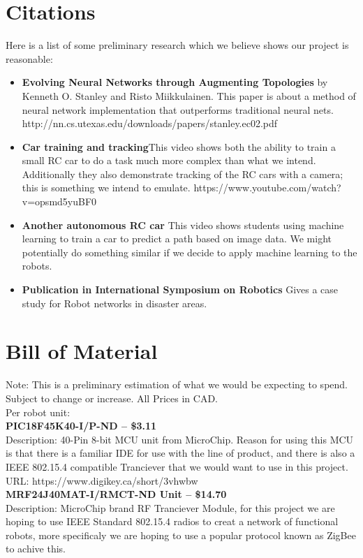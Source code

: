 \documentclass[a4paper]{article}
\begin{document}
	\section*{Citations}
	Here is a list of some preliminary research which we believe shows our project is reasonable:
	\begin{itemize}
		\item \textbf{Evolving Neural Networks through Augmenting Topologies} by Kenneth O. Stanley and Risto Miikkulainen. This paper is about a method of neural network implementation that outperforms traditional neural nets. http://nn.cs.utexas.edu/downloads/papers/stanley.ec02.pdf
		\item \textbf{Car training and tracking}This video shows both the ability to train a small RC car to do a task much more complex than what we intend. Additionally they also demonstrate tracking of the RC cars with a camera; this is something we intend to emulate. https://www.youtube.com/watch?v=opsmd5yuBF0
		\item \textbf{Another autonomous RC car} This video shows students using machine learning to train a car to predict a path based on image data. We might potentially do something similar if we decide to apply machine learning to the robots.
		\item \textbf{Publication in International Symposium on Robotics} Gives a case study for Robot networks in disaster areas.
	\end{itemize}
	\section*{Bill of Material}
	Note: This is a preliminary estimation of what we would be expecting to spend. Subject to change or increase. All Prices in CAD. \\
	Per robot unit: \\
	
	\textbf{PIC18F45K40-I/P-ND – \$3.11} \\
	Description: 40-Pin 8-bit MCU unit from MicroChip. Reason for using this MCU is that there is a familiar IDE for use with the line of product, and there is also a IEEE 802.15.4 compatible Tranciever that we would want to use in this project.
	URL: https://www.digikey.ca/short/3vhwbw \\
	
	\textbf{MRF24J40MAT-I/RMCT-ND Unit – \$14.70} \\
	Description: MicroChip brand RF Tranciever Module, for this project we are hoping to use IEEE Standard 802.15.4 radios to creat a network of functional robots, more specificaly we are hoping to use a popular protocol known as ZigBee to achive this. \\
	
\end{document}
